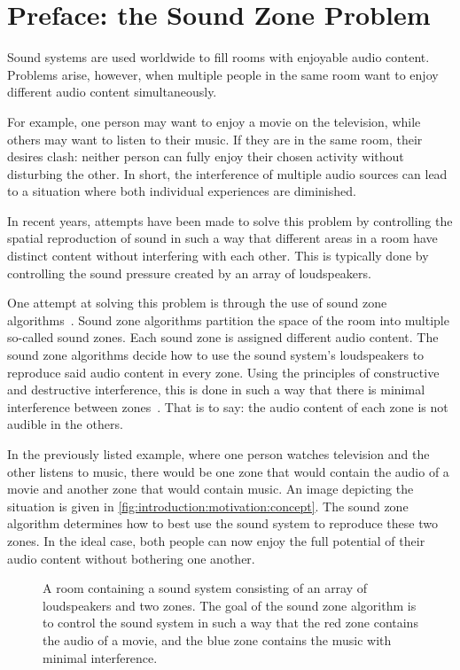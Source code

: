 \section{Preface: the Sound Zone Problem}
\label{ch:introduction:preface}
Sound systems are used worldwide to fill rooms with enjoyable audio content. 
Problems arise, however, when multiple people in the same room want to enjoy different audio content simultaneously.

For example, one person may want to enjoy a movie on the television, while others may want to listen to their music.
If they are in the same room, their desires clash: neither person can fully enjoy their chosen activity without disturbing
the other.
In short, the interference of multiple audio sources can lead to a situation where both individual experiences are diminished.

In recent years, attempts have been made to solve this problem by controlling the spatial reproduction of sound in such
a way that different areas in a room have distinct content without interfering with each other.
This is typically done by controlling the sound pressure created by an array of loudspeakers.

One attempt at solving this problem is through the use of sound zone algorithms~\cite{betlehem2015personal}.
Sound zone algorithms partition the space of the room into multiple so-called sound zones.
Each sound zone is assigned different audio content.
The sound zone algorithms decide how to use the sound system's loudspeakers to reproduce said audio content in every zone.
Using the principles of constructive and destructive interference, this is done in such a way that there is 
minimal interference between zones~\cite{betlehem2015personal}.
That is to say: the audio content of each zone is not audible in the others.

In the previously listed example, where one person watches television and the other listens to music,
there would be one zone that would contain the audio of a movie and another zone that would contain music.
An image depicting the situation is given in \autoref{fig:introduction:motivation:concept}.
The sound zone algorithm determines how to best use the sound system to reproduce these two zones.
In the ideal case, both people can now enjoy the full potential of their audio content without bothering one another.

\begin{figure}[]
    \centering
    \scalebox{1.0}{}
    \caption{A room containing a sound system consisting of an array of loudspeakers and two zones.
                The goal of the sound zone algorithm is to control the sound system in such a way that the red zone
                contains the audio of a movie, and the blue zone contains the music with minimal interference.}
    \label{fig:introduction:motivation:concept}
\end{figure}


